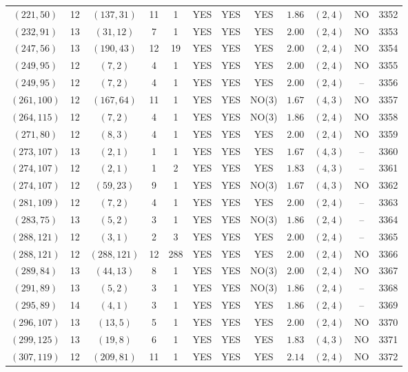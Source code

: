 \begin{longtable}{|c|c|c|c|c|c|c|c|c|c|c|c|}
$(221,50)$ & 12 & $(137,31)$ & 11 & 1 & YES & YES & YES & $1.86$ & $(2,4)$ & NO & 3352\\
$(232,91)$ & 13 & $(31,12)$ & 7 & 1 & YES & YES & YES & $2.00$ & $(2,4)$ & NO & 3353\\
$(247,56)$ & 13 & $(190,43)$ & 12 & 19 & YES & YES & YES & $2.00$ & $(2,4)$ & NO & 3354\\
$(249,95)$ & 12 & $(7,2)$ & 4 & 1 & YES & YES & YES & $2.00$ & $(2,4)$ & NO & 3355\\
$(249,95)$ & 12 & $(7,2)$ & 4 & 1 & YES & YES & YES & $2.00$ & $(2,4)$ & -- & 3356\\
$(261,100)$ & 12 & $(167,64)$ & 11 & 1 & YES & YES & NO(3) & $1.67$ & $(4,3)$ & NO & 3357\\
$(264,115)$ & 12 & $(7,2)$ & 4 & 1 & YES & YES & NO(3) & $1.86$ & $(2,4)$ & NO & 3358\\
$(271,80)$ & 12 & $(8,3)$ & 4 & 1 & YES & YES & YES & $2.00$ & $(2,4)$ & NO & 3359\\
$(273,107)$ & 13 & $(2,1)$ & 1 & 1 & YES & YES & YES & $1.67$ & $(4,3)$ & -- & 3360\\
$(274,107)$ & 12 & $(2,1)$ & 1 & 2 & YES & YES & YES & $1.83$ & $(4,3)$ & -- & 3361\\
$(274,107)$ & 12 & $(59,23)$ & 9 & 1 & YES & YES & NO(3) & $1.67$ & $(4,3)$ & NO & 3362\\
$(281,109)$ & 12 & $(7,2)$ & 4 & 1 & YES & YES & YES & $2.00$ & $(2,4)$ & -- & 3363\\
$(283,75)$ & 13 & $(5,2)$ & 3 & 1 & YES & YES & NO(3) & $1.86$ & $(2,4)$ & -- & 3364\\
$(288,121)$ & 12 & $(3,1)$ & 2 & 3 & YES & YES & YES & $2.00$ & $(2,4)$ & -- & 3365\\
$(288,121)$ & 12 & $(288,121)$ & 12 & 288 & YES & YES & YES & $2.00$ & $(2,4)$ & NO & 3366\\
$(289,84)$ & 13 & $(44,13)$ & 8 & 1 & YES & YES & NO(3) & $2.00$ & $(2,4)$ & NO & 3367\\
$(291,89)$ & 13 & $(5,2)$ & 3 & 1 & YES & YES & NO(3) & $1.86$ & $(2,4)$ & -- & 3368\\
$(295,89)$ & 14 & $(4,1)$ & 3 & 1 & YES & YES & YES & $1.86$ & $(2,4)$ & -- & 3369\\
$(296,107)$ & 13 & $(13,5)$ & 5 & 1 & YES & YES & YES & $2.00$ & $(2,4)$ & NO & 3370\\
$(299,125)$ & 13 & $(19,8)$ & 6 & 1 & YES & YES & YES & $1.83$ & $(4,3)$ & NO & 3371\\
$(307,119)$ & 12 & $(209,81)$ & 11 & 1 & YES & YES & YES & $2.14$ & $(2,4)$ & NO & 3372\\

\end{longtable}
